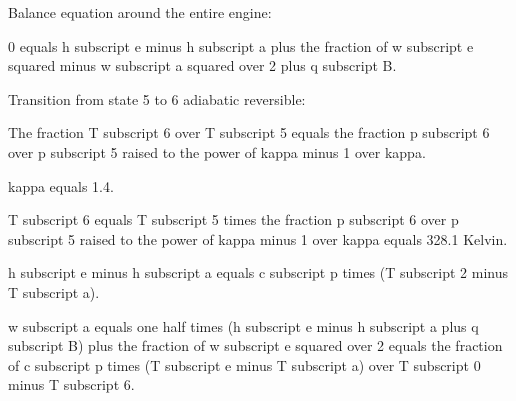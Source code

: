 Balance equation around the entire engine:

0 equals h subscript e minus h subscript a plus the fraction of w subscript e squared minus w subscript a squared over 2 plus q subscript B.

Transition from state 5 to 6 adiabatic reversible:

The fraction T subscript 6 over T subscript 5 equals the fraction p subscript 6 over p subscript 5 raised to the power of kappa minus 1 over kappa.

kappa equals 1.4.

T subscript 6 equals T subscript 5 times the fraction p subscript 6 over p subscript 5 raised to the power of kappa minus 1 over kappa equals 328.1 Kelvin.

h subscript e minus h subscript a equals c subscript p times (T subscript 2 minus T subscript a).

w subscript a equals one half times (h subscript e minus h subscript a plus q subscript B) plus the fraction of w subscript e squared over 2 equals the fraction of c subscript p times (T subscript e minus T subscript a) over T subscript 0 minus T subscript 6.